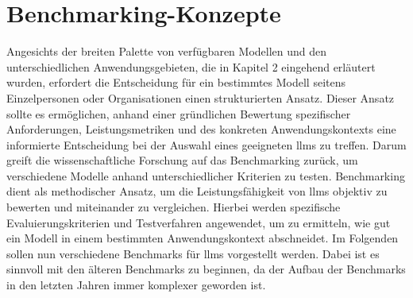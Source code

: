 \section{Benchmarking-Konzepte} \label{sec:benchmarking_konzepte}
Angesichts der breiten Palette von verfügbaren Modellen und den unterschiedlichen Anwendungsgebieten, die in Kapitel 2 eingehend erläutert wurden, erfordert die Entscheidung für ein bestimmtes Modell seitens Einzelpersonen oder Organisationen einen strukturierten Ansatz.
Dieser Ansatz sollte es ermöglichen, anhand einer gründlichen Bewertung spezifischer Anforderungen, Leistungsmetriken und des konkreten Anwendungskontexts eine informierte Entscheidung bei der Auswahl eines geeigneten \acp{llm} zu treffen.
Darum greift die wissenschaftliche Forschung auf das Benchmarking zurück, um verschiedene Modelle anhand unterschiedlicher Kriterien zu testen.
Benchmarking dient als methodischer Ansatz, um die Leistungsfähigkeit von \acp{llm} objektiv zu bewerten und miteinander zu vergleichen.
Hierbei werden spezifische Evaluierungskriterien und Testverfahren angewendet, um zu ermitteln, wie gut ein Modell in einem bestimmten Anwendungskontext abschneidet.
Im Folgenden sollen nun verschiedene Benchmarks für \acp{llm} vorgestellt werden.
Dabei ist es sinnvoll mit den älteren Benchmarks zu beginnen, da der Aufbau der Benchmarks in den letzten Jahren immer komplexer geworden ist.

